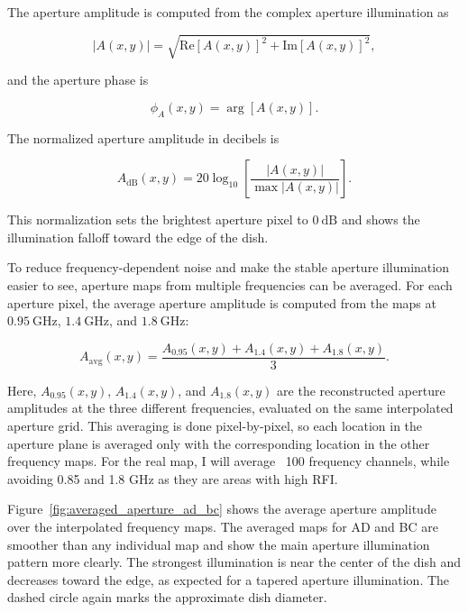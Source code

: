\documentclass[12pt]{extarticle}
\begin{document}
The aperture amplitude is computed from the complex aperture illumination as

\begin{equation}
    |A(x,y)|
    =
    \sqrt{
    \mathrm{Re}[A(x,y)]^2
    +
    \mathrm{Im}[A(x,y)]^2
    },
\end{equation}

and the aperture phase is

\begin{equation}
    \phi_A(x,y)
    =
    \arg[A(x,y)].
\end{equation}

The normalized aperture amplitude in decibels is

\begin{equation}
    A_{\mathrm{dB}}(x,y)
    =
    20\log_{10}
    \left[
    \frac{|A(x,y)|}{\max |A(x,y)|}
    \right].
\end{equation}

This normalization sets the brightest aperture pixel to $0~\mathrm{dB}$ and shows the illumination falloff toward the edge of the dish.

To reduce frequency-dependent noise and make the stable aperture illumination easier to see, aperture maps from multiple frequencies can be averaged. For each aperture pixel, the average aperture amplitude is computed from the maps at $0.95~\mathrm{GHz}$, $1.4~\mathrm{GHz}$, and $1.8~\mathrm{GHz}$:

\begin{equation}
A_{\mathrm{avg}}(x,y)
=
\frac{
A_{0.95}(x,y)
+
A_{1.4}(x,y)
+
A_{1.8}(x,y)
}{3}.
\end{equation}

Here, $A_{0.95}(x,y)$, $A_{1.4}(x,y)$, and $A_{1.8}(x,y)$ are the reconstructed aperture amplitudes at the three different frequencies, evaluated on the same interpolated aperture grid. This averaging is done pixel-by-pixel, so each location in the aperture plane is averaged only with the corresponding location in the other frequency maps. For the real map, I will average ~100 frequency channels, while avoiding 0.85 and 1.8 GHz as they are areas with high RFI.

Figure~\ref{fig:averaged_aperture_ad_bc} shows the average aperture amplitude over the interpolated frequency maps. The averaged maps for AD and BC are smoother than any individual map and show the main aperture illumination pattern more clearly. The strongest illumination is near the center of the dish and decreases toward the edge, as expected for a tapered aperture illumination. The dashed circle again marks the approximate dish diameter.
\end{document}
